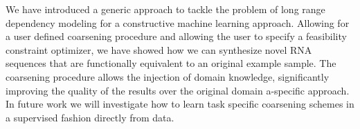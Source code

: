 \documentclass{article}
\begin{document}
We have introduced a generic approach to tackle the problem of long range
dependency modeling for a constructive machine learning approach. Allowing for
a user defined coarsening procedure and allowing the user to specify a
feasibility constraint optimizer, we have showed how we can synthesize novel
RNA sequences that are functionally equivalent to an original example sample.
The coarsening procedure allows the injection of domain knowledge,
significantly improving the quality of the results over the original domain
a-specific approach. In future work we will investigate how to learn task
specific coarsening schemes in a supervised fashion directly from data.



\end{document}

